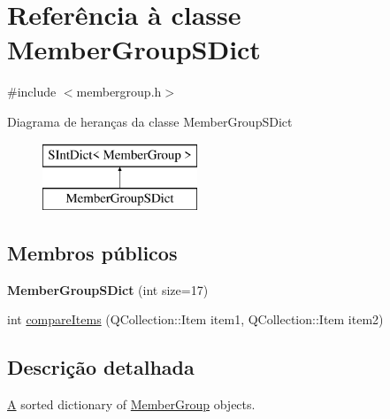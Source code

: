 \hypertarget{class_member_group_s_dict}{\section{Referência à classe Member\-Group\-S\-Dict}
\label{class_member_group_s_dict}
}


{\ttfamily \#include $<$membergroup.\-h$>$}

Diagrama de heranças da classe Member\-Group\-S\-Dict\begin{figure}[H]
\begin{center}
\leavevmode
\includegraphics[height=2.000000cm]{class_member_group_s_dict}
\end{center}
\end{figure}
\subsection*{Membros públicos}
\begin{DoxyCompactItemize}
\item 
\hypertarget{class_member_group_s_dict_a1e698246558663223d5e2ca16b5171ba}{{\bfseries Member\-Group\-S\-Dict} (int size=17)}\label{class_member_group_s_dict_a1e698246558663223d5e2ca16b5171ba}

\item 
int \hyperlink{class_member_group_s_dict_a219450accf048597ffc7113ecde4c402}{compare\-Items} (Q\-Collection\-::\-Item item1, Q\-Collection\-::\-Item item2)
\end{DoxyCompactItemize}


\subsection{Descrição detalhada}
\hyperlink{class_a}{A} sorted dictionary of \hyperlink{class_member_group}{Member\-Group} objects. 


